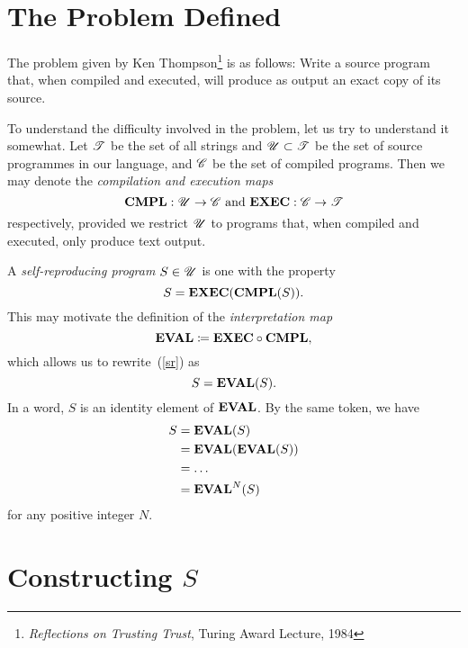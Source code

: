\section{The Problem Defined}
The problem given by Ken Thompson\footnote{{\sl Reflections on Trusting Trust}, Turing Award
Lecture, 1984} is as follows: 
Write a source program that, when compiled and executed, will produce as output an exact copy of its
source.

To understand the difficulty involved in the problem, let us try to understand it somewhat.  Let
$\mathscr{T}$ be the set of all strings and $\mathscr{U}\subset\mathscr{T}$ be the set of source programmes in our
language, and $\mathscr{C}$ be the set of compiled programs.
Then we may denote the {\sl compilation {\rm and} execution maps\/}
\[ \text{\bf CMPL}: \mathscr{U} \to \mathscr{C} \text{~and~} \text{\bf EXEC}: \mathscr{C} \to \mathscr{T} \]
respectively, provided we restrict $\mathscr{U}$ to programs that, when compiled and executed, only produce
text output.

A {\sl self-reproducing program\/} $S\in\mathscr{U}$ is one with the property
\begin{equation}\label{sr}
    S = \text{\bf EXEC}(\text{\bf CMPL}(S)).
\end{equation}
This may motivate the definition of the {\sl interpretation map\/}
\[ \text{\bf EVAL} \coloneqq \text{\bf EXEC}\circ\text{\bf CMPL}, \]
which allows us to rewrite~(\ref{sr}) as
\[ S = \text{\bf EVAL}(S). \]
In a word, $S$ is an identity element of $\text{\bf EVAL}$.
By the same token, we have
\begin{align*}
    S &= \text{\bf EVAL}(S) \\
      &= \text{\bf EVAL}(\text{\bf EVAL}(S)) \\
      &= \ldots{} \\
      &= \text{\bf EVAL}^N(S)
\end{align*}
for any positive integer $N$.

\section{Constructing $S$}

